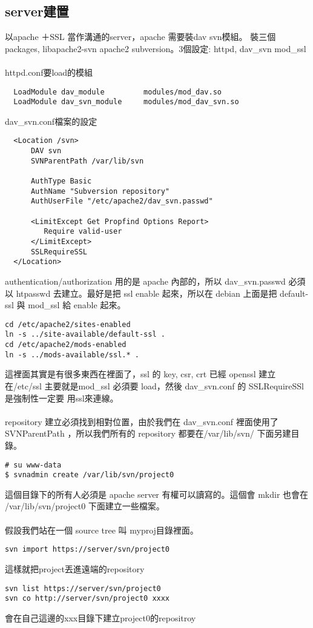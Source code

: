  \subsection{server建置}
  以apache ＋SSL 當作溝通的server，apache 需要裝dav svn模組。
  裝三個packages, libapache2-svn apache2 subversion。3個設定: httpd, dav\_svn
  mod\_ssl
  \\\\
  httpd.conf要load的模組
  \begin{verbatim}
  LoadModule dav_module         modules/mod_dav.so
  LoadModule dav_svn_module     modules/mod_dav_svn.so
  \end{verbatim}
  dav\_svn.conf檔案的設定
  \begin{verbatim}
  <Location /svn>
      DAV svn
      SVNParentPath /var/lib/svn

      AuthType Basic
      AuthName "Subversion repository"
      AuthUserFile "/etc/apache2/dav_svn.passwd"

      <LimitExcept Get Propfind Options Report>
         Require valid-user
      </LimitExcept>
      SSLRequireSSL
  </Location>
  \end{verbatim}
  authentication/authorization 用的是 apache 內部的，所以 dav\_svn.passwd 必須以
  htpasswd 去建立。最好是把 ssl enable 起來，所以在 debian 上面是把 default-ssl
  與 mod\_ssl 給 enable 起來。
  \begin{verbatim}
cd /etc/apache2/sites-enabled
ln -s ../site-available/default-ssl .
cd /etc/apache2/mods-enabled
ln -s ../mods-available/ssl.* .
  \end{verbatim}
  這裡面其實是有很多東西在裡面了，ssl 的 key, csr, crt 已經 openssl 建立在/etc/ssl
  主要就是mod\_ssl 必須要 load，然後 dav\_svn.conf 的 SSLRequireSSl 是強制性一定要
  用ssl來連線。
  \\\\
  repository 建立必須找到相對位置，由於我們在 dav\_svn.conf 裡面使用了 SVNParentPath
  ，所以我們所有的 repository 都要在/var/lib/svn/ 下面另建目錄。
  \begin{verbatim}
# su www-data
$ svnadmin create /var/lib/svn/project0
  \end{verbatim}
  這個目錄下的所有人必須是 apache server 有權可以讀寫的。這個會 mkdir 也會在
  /var/lib/svn/project0 下面建立一些檔案。
  \\\\
  假設我們站在一個 source tree 叫 myproj目錄裡面。
  \begin{verbatim}
svn import https://server/svn/project0
  \end{verbatim}
  這樣就把project丟進遠端的repository
  \begin{verbatim}
svn list https://server/svn/project0
svn co http://server/svn/project0 xxxx
  \end{verbatim}
  會在自己這邊的xxx目錄下建立project0的repositroy
